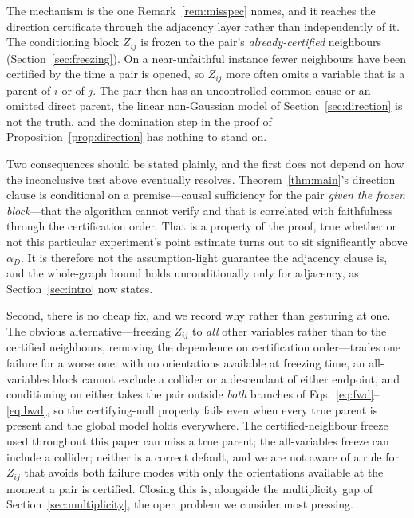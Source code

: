 The mechanism is the one Remark~\ref{rem:misspec} names, and it reaches the
direction certificate through the adjacency layer rather than independently of
it. The conditioning block $Z_{ij}$ is frozen to the pair's
\emph{already-certified} neighbours (Section~\ref{sec:freezing}). On a
near-unfaithful instance fewer neighbours have been certified by the time a
pair is opened, so $Z_{ij}$ more often omits a variable that is a parent of
$i$ or of $j$. The pair then has an uncontrolled common cause or an omitted
direct parent, the linear non-Gaussian model of
Section~\ref{sec:direction} is not the truth, and the domination step in the
proof of Proposition~\ref{prop:direction} has nothing to stand on.



Two consequences should be stated plainly, and the first does not depend on
how the inconclusive test above eventually resolves. Theorem~\ref{thm:main}'s
direction clause is conditional on a premise---causal sufficiency for the pair
\emph{given the frozen block}---that the algorithm cannot verify and that is
correlated with faithfulness through the certification order. That is a
property of the proof, true whether or not this particular experiment's point
estimate turns out to sit significantly above $\alpha_D$. It is therefore not
the assumption-light guarantee the adjacency clause is, and the whole-graph
bound holds unconditionally only for adjacency, as Section~\ref{sec:intro}
now states.

Second, there is no cheap fix, and we record why rather than gesturing at one.
The obvious alternative---freezing $Z_{ij}$ to \emph{all} other variables
rather than to the certified neighbours, removing the dependence on
certification order---trades one failure for a worse one: with no
orientations available at freezing time, an all-variables block cannot
exclude a collider or a descendant of either endpoint, and conditioning on
either takes the pair outside \emph{both} branches of
Eqs.~\eqref{eq:fwd}--\eqref{eq:bwd}, so the certifying-null property fails
even when every true parent is present and the global model holds
everywhere. The certified-neighbour freeze used throughout this paper can
miss a true parent; the all-variables freeze can include a collider; neither
is a correct default, and we are not aware of a rule for $Z_{ij}$ that avoids
both failure modes with only the orientations available at the moment a pair
is certified. Closing this is, alongside the multiplicity gap of
Section~\ref{sec:multiplicity}, the open problem we consider most pressing.

